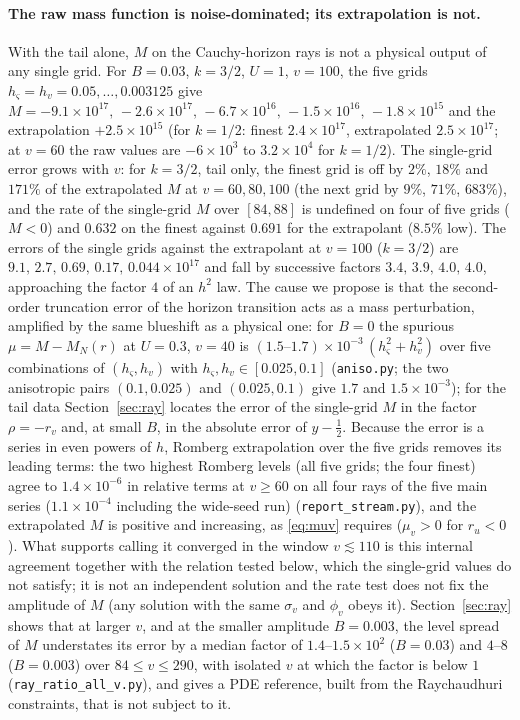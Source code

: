 \documentclass[11pt]{article}
\begin{document}
\paragraph{The raw mass function is noise-dominated; its extrapolation is not.} With the tail alone, $M$ on the Cauchy-horizon rays is not a physical output of any single grid. For $B=0.03$, $k=3/2$, $U=1$, $v=100$, the five grids $h_\varsigma=h_v=0.05,\dots,0.003125$ give $M=-9.1\times10^{17},\,-2.6\times10^{17},\,-6.7\times10^{16},\,-1.5\times10^{16},\,-1.8\times10^{15}$ and the extrapolation $+2.5\times10^{15}$ (for $k=1/2$: finest $2.4\times10^{17}$, extrapolated $2.5\times10^{17}$; at $v=60$ the raw values are $-6\times10^{3}$ to $3.2\times10^{4}$ for $k=1/2$). The single-grid error grows with $v$: for $k=3/2$, tail only, the finest grid is off by $2\%$, $18\%$ and $171\%$ of the extrapolated $M$ at $v=60,80,100$ (the next grid by $9\%$, $71\%$, $683\%$), and the rate of the single-grid $M$ over $[84,88]$ is undefined on four of five grids ($M<0$) and $0.632$ on the finest against $0.691$ for the extrapolant ($8.5\%$ low). The errors of the single grids against the extrapolant at $v=100$ ($k=3/2$) are $9.1,\,2.7,\,0.69,\,0.17,\,0.044\times10^{17}$ and fall by successive factors $3.4,\,3.9,\,4.0,\,4.0$, approaching the factor $4$ of an $h^2$ law. The cause we propose is that the second-order truncation error of the horizon transition acts as a mass perturbation, amplified by the same blueshift as a physical one: for $B=0$ the spurious $\mu=M-M_N(r)$ at $U=0.3$, $v=40$ is $(1.5\text{--}1.7)\times10^{-3}\,(h_\varsigma^2+h_v^2)$ over five combinations of $(h_\varsigma,h_v)$ with $h_\varsigma,h_v\in[0.025,0.1]$ (\texttt{aniso.py}; the two anisotropic pairs $(0.1,0.025)$ and $(0.025,0.1)$ give $1.7$ and $1.5\times10^{-3}$); for the tail data Section~\ref{sec:ray} locates the error of the single-grid $M$ in the factor $\rho=-r_v$ and, at small $B$, in the absolute error of $y-\tfrac12$. Because the error is a series in even powers of $h$, Romberg extrapolation over the five grids removes its leading terms: the two highest Romberg levels (all five grids; the four finest) agree to $1.4\times10^{-6}$ in relative terms at $v\ge60$ on all four rays of the five main series ($1.1\times10^{-4}$ including the wide-seed run) (\texttt{report\_stream.py}), and the extrapolated $M$ is positive and increasing, as \eqref{eq:muv} requires ($\mu_v>0$ for $r_u<0$). What supports calling it converged in the window $v\lesssim110$ is this internal agreement together with the relation tested below, which the single-grid values do not satisfy; it is not an independent solution and the rate test does not fix the amplitude of $M$ (any solution with the same $\sigma_v$ and $\phi_v$ obeys it). Section~\ref{sec:ray} shows that at larger $v$, and at the smaller amplitude $B=0.003$, the level spread of $M$ understates its error by a median factor of $1.4$--$1.5\times10^{2}$ ($B=0.03$) and $4$--$8$ ($B=0.003$) over $84\le v\le290$, with isolated $v$ at which the factor is below $1$ (\texttt{ray\_ratio\_all\_v.py}), and gives a PDE reference, built from the Raychaudhuri constraints, that is not subject to it.
\end{document}
